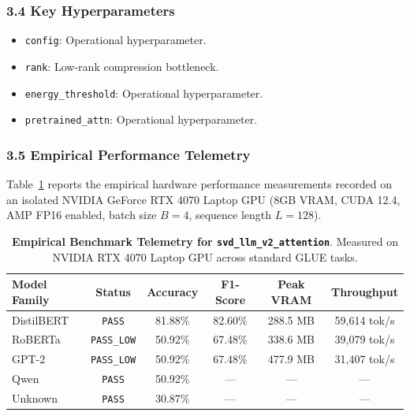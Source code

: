 \subsubsection*{3.4 Key Hyperparameters}
\begin{itemize}
    \item \texttt{config}: Operational hyperparameter.
    \item \texttt{rank}: Low-rank compression bottleneck.
    \item \texttt{energy\_threshold}: Operational hyperparameter.
    \item \texttt{pretrained\_attn}: Operational hyperparameter.
\end{itemize}

\subsubsection*{3.5 Empirical Performance Telemetry}
Table~\ref{tab:telemetry_svd_llm_v2_attention} reports the empirical hardware performance measurements recorded on an isolated NVIDIA GeForce RTX 4070 Laptop GPU (8GB VRAM, CUDA 12.4, AMP FP16 enabled, batch size $B=4$, sequence length $L=128$).

\begin{table}[h]
\centering
\small
\caption{\textbf{Empirical Benchmark Telemetry for \texttt{svd\_llm\_v2\_attention}}. Measured on NVIDIA RTX 4070 Laptop GPU across standard GLUE tasks.}
\label{tab:telemetry_svd_llm_v2_attention}
\begin{tabular*}{\columnwidth}{@{\extracolsep{\fill}}lccccc}
\toprule
\textbf{Model Family} & \textbf{Status} & \textbf{Accuracy} & \textbf{F1-Score} & \textbf{Peak VRAM} & \textbf{Throughput} \\
\midrule
DistilBERT & \texttt{PASS} & 81.88\% & 82.60\% & 288.5 MB & 59,614 tok/s \\
RoBERTa & \texttt{PASS\_LOW} & 50.92\% & 67.48\% & 338.6 MB & 39,079 tok/s \\
GPT-2 & \texttt{PASS\_LOW} & 50.92\% & 67.48\% & 477.9 MB & 31,407 tok/s \\
Qwen & \texttt{PASS} & 50.92\% & --- & --- & --- \\
Unknown & \texttt{PASS} & 30.87\% & --- & --- & --- \\
\bottomrule
\end{tabular*}
\end{table}

